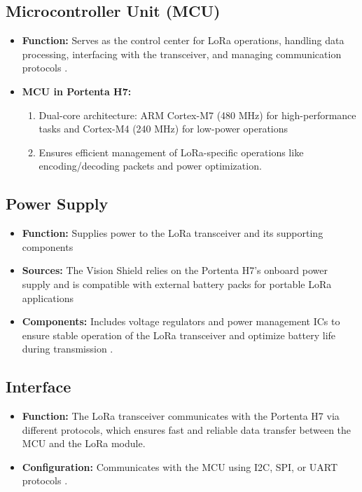 \subsection{Microcontroller Unit (MCU)}
\begin{itemize}
	\item \textbf{Function:} Serves as the control center for LoRa operations, handling data processing, interfacing with the transceiver, and managing communication protocols \cite{arduino_portenta:2025}.
	\item \textbf{MCU in Portenta H7:} 
	\begin{enumerate}
		\item Dual-core architecture: ARM Cortex-M7 (480 MHz) for high-performance tasks and Cortex-M4 (240 MHz) for low-power operations 
		\item Ensures efficient management of LoRa-specific operations like encoding/decoding packets and power optimization.\cite{arm_cortex:2025}
	\end{enumerate}
\end{itemize}

\subsection{Power Supply}
\begin{itemize}
	\item \textbf{Function:} Supplies power to the LoRa transceiver and its supporting components 
	\item \textbf{Sources:} The Vision Shield relies on the Portenta H7’s onboard power supply and is compatible with external battery packs for portable LoRa applications 
	\item \textbf{Components:} Includes voltage regulators and power management ICs to ensure stable operation of the LoRa transceiver and optimize battery life during transmission \cite{arduino_portenta:2025}.
\end{itemize}

\subsection{Interface}
\begin{itemize}
	\item \textbf{Function:} The LoRa transceiver communicates with the Portenta H7 via different protocols, which ensures fast and reliable data transfer between the MCU and the LoRa module.
	\item \textbf{Configuration:} Communicates with the MCU using I2C, SPI, or UART protocols \cite{arduino_portenta:2025}.
\end{itemize}

